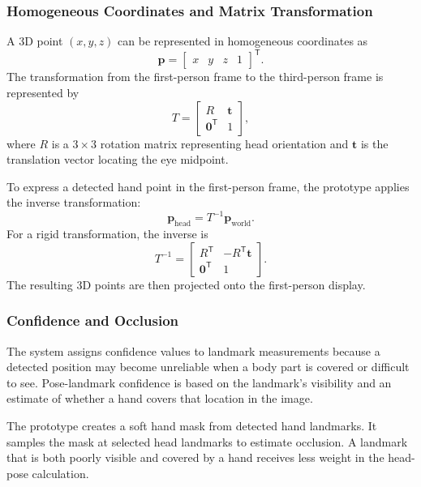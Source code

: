 \documentclass[12pt,a4paper]{article}
\begin{document}
\subsubsection{Homogeneous Coordinates and Matrix Transformation}

A 3D point $(x,y,z)$ can be represented in homogeneous coordinates as
\[
\mathbf{p} =
\begin{bmatrix}
x & y & z & 1
\end{bmatrix}^{\mathsf T}.
\]
The transformation from the first-person frame to the third-person frame is represented by
\begin{equation}
T =
\begin{bmatrix}
R & \mathbf{t}\\
\mathbf{0}^{\mathsf T} & 1
\end{bmatrix},
\end{equation}
where $R$ is a $3\times3$ rotation matrix representing head orientation and $\mathbf{t}$ is the translation vector locating the eye midpoint.

To express a detected hand point in the first-person frame, the prototype applies the inverse transformation:
\begin{equation}
\mathbf{p}_{\mathrm{head}} = T^{-1}\mathbf{p}_{\mathrm{world}}.
\end{equation}
For a rigid transformation, the inverse is
\begin{equation}
T^{-1} =
\begin{bmatrix}
R^{\mathsf T} & -R^{\mathsf T}\mathbf{t}\\
\mathbf{0}^{\mathsf T} & 1
\end{bmatrix}.
\end{equation}
The resulting 3D points are then projected onto the first-person display.

\subsubsection{Confidence and Occlusion}

The system assigns confidence values to landmark measurements because a detected position may become unreliable when a body part is covered or difficult to see. Pose-landmark confidence is based on the landmark's visibility and an estimate of whether a hand covers that location in the image.

The prototype creates a soft hand mask from detected hand landmarks. It samples the mask at selected head landmarks to estimate occlusion. A landmark that is both poorly visible and covered by a hand receives less weight in the head-pose calculation.
\end{document}
